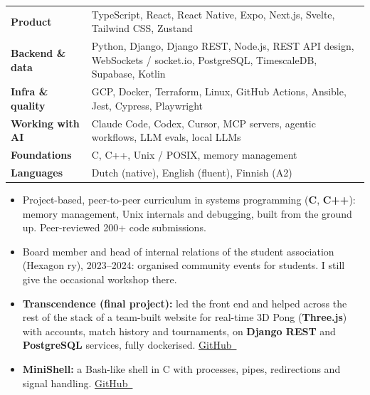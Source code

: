 \documentclass[10pt,a4paper,ragged2e,withhyper]{altacv}
\newcommand{\cvlink}[2]{\href{#1}{\color{Teal}#2~\raisebox{0.1ex}{\scriptsize$\nearrow$}}}
\begin{document}
\clearpage
{}
\begin{tabular}{@{}p{3.6cm}p{12.4cm}@{}}
  \textbf{Product} & TypeScript, React, React Native, Expo, Next.js, Svelte, Tailwind CSS, Zustand \\[0.4ex]
  \textbf{Backend \& data} & Python, Django, Django REST, Node.js, REST API design, WebSockets / socket.io,
                              PostgreSQL, TimescaleDB, Supabase, Kotlin \\[0.4ex]
  \textbf{Infra \& quality} & GCP, Docker, Terraform, Linux, GitHub Actions, Ansible, Jest, Cypress, Playwright \\[0.4ex]
  \textbf{Working with AI} & Claude Code, Codex, Cursor, MCP servers, agentic workflows, LLM evals, local LLMs \\[0.4ex]
  \textbf{Foundations} & C, C++, Unix / POSIX, memory management \\[0.4ex]
  \textbf{Languages} & Dutch (native), English (fluent), Finnish (A2) \\
\end{tabular}


\begin{itemize}
  \item Project-based, peer-to-peer curriculum in systems programming (\textbf{C}, \textbf{C++}): memory management,
        Unix internals and debugging, built from the ground up. Peer-reviewed 200+ code submissions.
  \item Board member and head of internal relations of the student association (Hexagon ry), 2023--2024:
        organised community events for students. I still give the occasional workshop there.
  \item \textbf{Transcendence (final project):} led the front end and helped across the rest of the stack of a team-built website for real-time 3D Pong (\textbf{Three.js}) with
        accounts, match history and tournaments, on \textbf{Django REST} and \textbf{PostgreSQL} services, fully dockerised.
        \cvlink{https://github.com/Nicktvdd/transcendence}{GitHub}
  \item \textbf{MiniShell:} a Bash-like shell in C with processes, pipes, redirections and signal handling.
        \cvlink{https://github.com/Nicktvdd/MiniShell}{GitHub}
\end{itemize}

\divider
\end{document}

